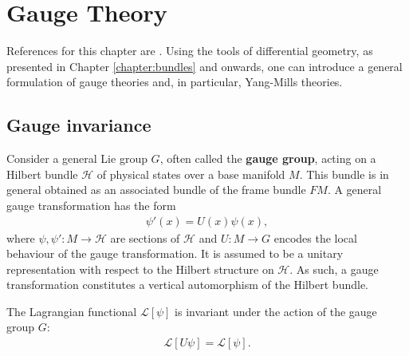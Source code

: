 \chapter{Gauge Theory}\label{chapter:gauge_theory}

    References for this chapter are \cite{principal_bundles, sen_nash, schuller, gauge1}. Using the tools of differential geometry, as presented in Chapter \ref{chapter:bundles} and onwards, one can introduce a general formulation of gauge theories and, in particular, Yang-Mills theories.

\section{Gauge invariance}

    Consider a general Lie group $G$, often called the \textbf{gauge group}, acting on a Hilbert bundle $\mathcal{H}$ of physical states over a base manifold $M$. This bundle is in general obtained as an associated bundle of the frame bundle $FM$. A general gauge transformation has the form
    \begin{gather}
        \label{gauge:gauge_transformation}
        \psi'(x) = U(x)\psi(x),
    \end{gather}
    where $\psi,\psi':M\rightarrow\mathcal{H}$ are sections of $\mathcal{H}$ and $U:M\rightarrow G$ encodes the local behaviour of the gauge transformation. It is assumed to be a unitary representation with respect to the Hilbert structure on $\mathcal{H}$. As such, a gauge transformation constitutes a vertical automorphism of the Hilbert bundle.

    \begin{axiom}
        The Lagrangian functional $\mathcal{L}[\psi]$ is invariant under the action of the gauge group $G$:
        \begin{gather}
            \mathcal{L}[U\psi] = \mathcal{L}[\psi].
        \end{gather}
    \end{axiom}

